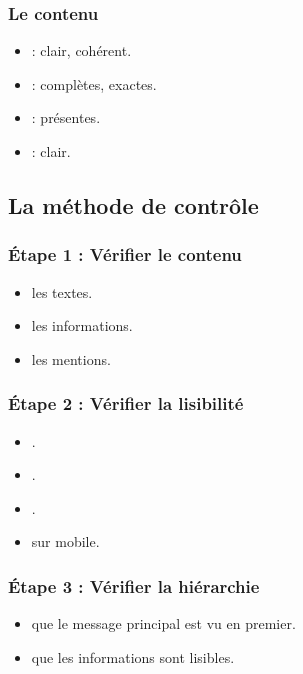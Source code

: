 \subsubsection{Le contenu}

\begin{itemize}
    \item {} : clair, cohérent.
    \item {} : complètes, exactes.
    \item {} : présentes.
    \item {} : clair.
\end{itemize}

\subsection{La méthode de contrôle}

\subsubsection{Étape 1 : Vérifier le contenu}

\begin{itemize}
    \item {} les textes.
    \item {} les informations.
    \item {} les mentions.
\end{itemize}

\subsubsection{Étape 2 : Vérifier la lisibilité}

\begin{itemize}
    \item {}.
    \item {}.
    \item {}.
    \item {} sur mobile.
\end{itemize}

\subsubsection{Étape 3 : Vérifier la hiérarchie}

\begin{itemize}
    \item {} que le message principal est vu en premier.
    \item {} que les informations sont lisibles.
\end{itemize}

